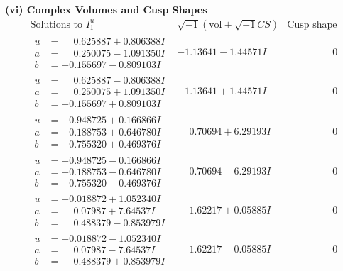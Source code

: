 \documentclass[1p]{elsarticle_modified}
\theoremstyle{definition}
\newcommand{\I}{\sqrt{-1}}
\begin{document}
\newpage\flushleft \textbf{(vi) Complex Volumes and Cusp Shapes}
$$\begin{array}{c|c|c}  
\text{Solutions to }I^u_{1}& \I (\text{vol} + \sqrt{-1}CS) & \text{Cusp shape}\\
 \hline 
\begin{aligned}
u &= \phantom{-}0.625887 + 0.806388 I \\
a &= \phantom{-}0.250075 - 1.091350 I \\
b &= -0.155697 - 0.809103 I\end{aligned}
 & -1.13641 - 1.44571 I & \phantom{-0.000000 } 0 \\ \hline\begin{aligned}
u &= \phantom{-}0.625887 - 0.806388 I \\
a &= \phantom{-}0.250075 + 1.091350 I \\
b &= -0.155697 + 0.809103 I\end{aligned}
 & -1.13641 + 1.44571 I & \phantom{-0.000000 } 0 \\ \hline\begin{aligned}
u &= -0.948725 + 0.166866 I \\
a &= -0.188753 + 0.646780 I \\
b &= -0.755320 + 0.469376 I\end{aligned}
 & \phantom{-}0.70694 + 6.29193 I & \phantom{-0.000000 } 0 \\ \hline\begin{aligned}
u &= -0.948725 - 0.166866 I \\
a &= -0.188753 - 0.646780 I \\
b &= -0.755320 - 0.469376 I\end{aligned}
 & \phantom{-}0.70694 - 6.29193 I & \phantom{-0.000000 } 0 \\ \hline\begin{aligned}
u &= -0.018872 + 1.052340 I \\
a &= \phantom{-}0.07987 + 7.64537 I \\
b &= \phantom{-}0.488379 - 0.853979 I\end{aligned}
 & \phantom{-}1.62217 + 0.05885 I & \phantom{-0.000000 } 0 \\ \hline\begin{aligned}
u &= -0.018872 - 1.052340 I \\
a &= \phantom{-}0.07987 - 7.64537 I \\
b &= \phantom{-}0.488379 + 0.853979 I\end{aligned}
 & \phantom{-}1.62217 - 0.05885 I & \phantom{-0.000000 } 0 \\ \hline\begin{aligned}

\end{aligned}
\end{array}$$
\end{document}
